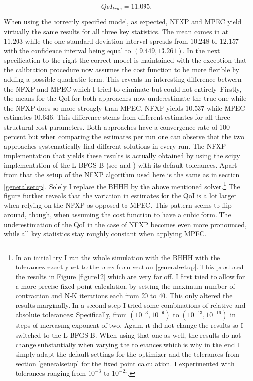 \begin{equation*}
	QoI_{true} = 11.095.
\end{equation*}

When using the correctly specified model, as expected, NFXP and MPEC yield virtually the same results for all three key statistics. The mean comes in at $11.203$ while the one standard deviation interval spreads from $10.248$ to $12.157$ with the confidence interval being equal to $(9.449, 13.261)$. In the next specification to the right the correct model is maintained with the exception that the calibration procedure now assumes the cost function to be more flexible by adding a possible quadratic term. This reveals an interesting difference between the NFXP and MPEC which I tried to eliminate but could not entirely. Firstly, the means for the QoI for both approaches now underestimate the true one while the NFXP does so more strongly than MPEC. NFXP yields $10.537$ while MPEC estimates $10.646$. This difference stems from different estimates for all three structural cost parameters. Both approaches have a convergence rate of 100 percent but when comparing the estimates per run one can observe that the two approaches systematically find different solutions in every run. The NFXP implementation that yields these results is actually obtained by using the scipy implementation of the L-BFGS-B (see \cite{Byrd.1997} and \cite{scipy.2020}) with its default tolerances. Apart from that the setup of the NFXP algorithm used here is the same as in section \ref{generalsetup}. Solely I replace the BHHH by the above mentioned solver.\footnote{ In an initial try I ran the whole simulation with the BHHH with the tolerances exactly set to the ones from section \ref{generalsetup}. This produced the results in Figure \ref{figure12} which are very far off. I first tried to allow for a more precise fixed point calculation by setting the maximum number of contraction and N-K iterations each from 20 to 40. This only altered the results marginally. In a second step I tried some combinations of relative and absolute tolerances: Specifically, from $(10^{-3}, 10^{-6})$ to $(10^{-13}, 10^{-16})$ in steps of increasing exponent of two. Again, it did not change the results so I switched to the L-BFGS-B. When using that one as well, the results do not change substantially when varying the tolerances which is why in the end I simply adapt the default settings for the optimizer and the tolerances from section \ref{generalsetup} for the fixed point calculation. I experimented with tolerances ranging from $10^{-3}$ to $10^{-21}$.} The figure further reveals that the variation in estimates for the QoI is a lot larger when relying on the NFXP as opposed to MPEC. This pattern seems to flip around, though, when assuming the cost function to have a cubic form. The underestimation of the QoI in the case of NFXP becomes even more pronounced, while all key statistics stay roughly constant when applying MPEC.

